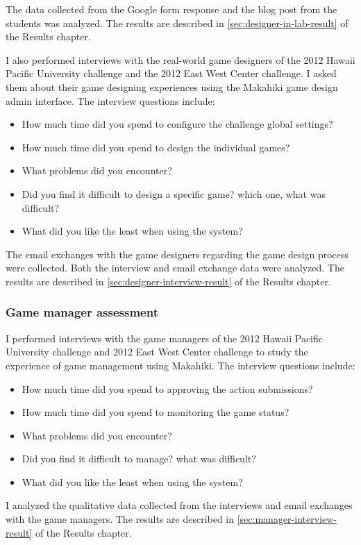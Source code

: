 The data collected from the Google form response and the blog post from the students was analyzed. The results are described in \autoref{sec:designer-in-lab-result} of the Results chapter.

I also performed interviews with the real-world game designers of the 2012 Hawaii Pacific University challenge and the 2012 East West Center challenge. I asked them about their game designing experiences using the Makahiki game design admin
 interface. The interview questions include:
\begin{itemize}
    \item How much time did you spend to configure the challenge global settings?
    \item How much time did you spend to design the individual games?
    \item What problems did you encounter?
    \item Did you find it difficult to design a specific game? which one, what was difficult?
    \item What did you like the least when using the system?
\end{itemize}

The email exchanges with the game designers regarding the game design process were collected. Both the interview and email exchange data were analyzed. The results are described in \autoref{sec:designer-interview-result} of the Results chapter.

\subsubsection{Game manager assessment}
I performed interviews with the game managers of the 2012 Hawaii Pacific University challenge and 2012 East West Center challenge to study the experience of game management using Makahiki. The interview questions include:
\begin{itemize}
\item How much time did you spend to approving the action submissions?
\item How much time did you spend to monitoring the game status?
\item What problems did you encounter?
\item Did you find it difficult to manage? what was difficult?
\item What did you like the least when using the system?
\end{itemize}

I analyzed the qualitative data collected from the interviews and email exchanges with the game managers. The results are described in \autoref{sec:manager-interview-result} of the Results chapter.

